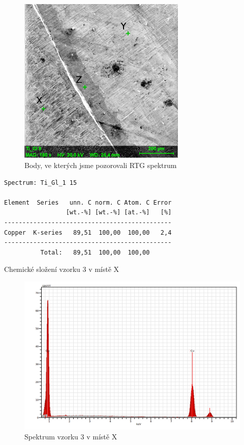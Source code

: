 \begin{figure}[htbp]
\centering
\includegraphics[width=8cm]{graficos/3/body.png}
\caption{Body, ve kterých jsme pozorovali RTG spektrum}
\label{o:vz3_body}
\end{figure}


\begin{tabulka}[htbp]
\centering
\begin{BVerbatim}
Spectrum: Ti_Gl_1 15

Element  Series   unn. C norm. C Atom. C Error
                 [wt.-%] [wt.-%] [at.-%]   [%]
----------------------------------------------
Copper  K-series   89,51  100,00  100,00   2,4
----------------------------------------------
          Total:   89,51  100,00  100,00
\end{BVerbatim}
\caption{Chemické složení vzorku 3 v místě X}
\label{t:vz03_X}
\end{tabulka}

\begin{figure}[htbp]
\centering
\includegraphics[width=12cm]{graficos/3/Xsp.png}
\caption{Spektrum vzorku 3 v místě X}
\label{o:vz3_X}
\end{figure}


